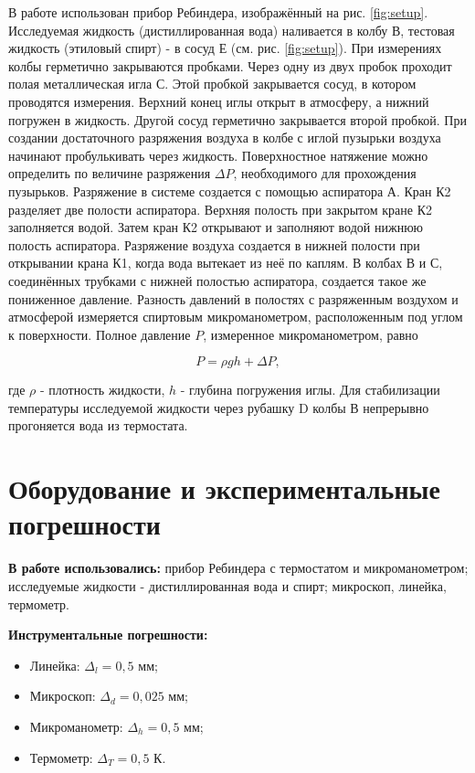 \documentclass[a4paper,12pt]{article} %
\begin{document}
В работе использован прибор Ребиндера, изображённый на рис. \ref{fig:setup}. Исследуемая жидкость (дистиллированная вода) наливается в колбу В, тестовая жидкость (этиловый спирт) - в сосуд Е (см. рис. \ref{fig:setup}). При измерениях колбы герметично закрываются пробками. Через одну из двух пробок проходит полая металлическая игла С. Этой пробкой закрывается сосуд, в котором  проводятся измерения. Верхний конец иглы открыт в атмосферу, а нижний погружен в жидкость. Другой сосуд герметично закрывается второй пробкой. При создании достаточного  разряжения воздуха в колбе с иглой пузырьки воздуха начинают пробулькивать через жидкость. Поверхностное натяжение можно определить по величине разряжения $\Delta P$, необходимого для прохождения пузырьков.
Разряжение в системе создается с помощью аспиратора А. Кран К2 разделяет две полости аспиратора. Верхняя полость при закрытом кране К2 заполняется водой. Затем кран К2 открывают и заполняют водой нижнюю полость аспиратора. Разряжение воздуха создается в нижней полости при открывании крана К1, когда вода вытекает из неё по каплям. В колбах В и С, соединённых трубками с нижней полостью аспиратора, создается такое же пониженное давление. Разность давлений в полостях с разряженным воздухом и атмосферой измеряется спиртовым микроманометром, расположенным под углом к поверхности. Полное давление $P$, измеренное микроманометром, равно

\begin{equation}
    P = \rho gh + \Delta P,
    \label{rhogh}
\end{equation}

где $\rho$ - плотность жидкости, $h$ - глубина погружения иглы. Для стабилизации температуры исследуемой жидкости через рубашку D колбы В непрерывно прогоняется вода из термостата.

\section{Оборудование и экспериментальные погрешности}

\textbf{В работе использовались:} прибор  Ребиндера  с термостатом и микроманометром; исследуемые жидкости - дистиллированная вода и спирт; микроскоп, линейка, термометр.

\textbf{Инструментальные погрешности:}

\begin{itemize}
    \item Линейка: $\Delta_l = 0,5$ мм;
    \item Микроскоп: $\Delta_d = 0,025$ мм;
    \item Микроманометр: $\Delta_h = 0,5$ мм;
    \item Термометр: $\Delta_T = 0,5$ К.
\end{itemize}
\end{document}
